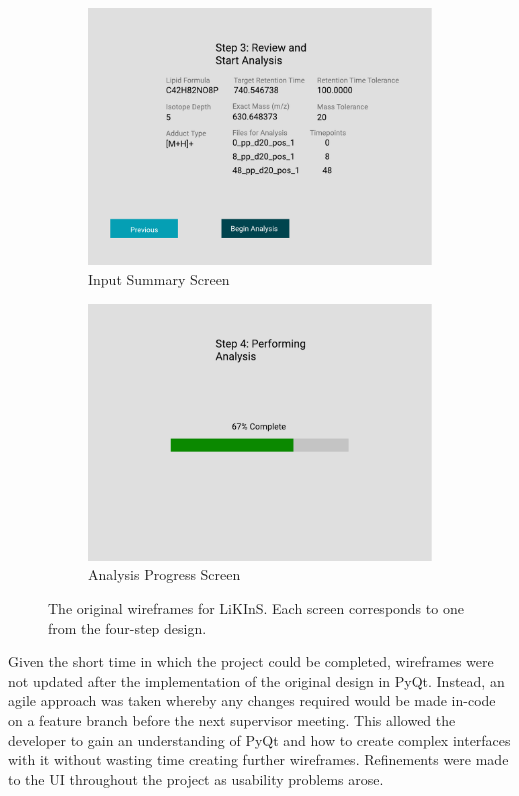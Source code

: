 \documentclass{l4proj}
\begin{document}
\begin{figure}
\begin{subfigure}{0.4\linewidth}
        \includegraphics[width=\linewidth]{dissertation/images/wireframes/wireframe3.pdf}
    \caption{Input Summary Screen}
        \end{subfigure}
        \begin{subfigure}{0.4\linewidth}
        \includegraphics[width=\linewidth]{dissertation/images/wireframes/wireframe4.pdf}
    \caption{Analysis Progress Screen}
    \end{subfigure}
    \caption{The original wireframes for LiKInS. Each screen corresponds to one from the four-step design.}
    \label{fig:wireframes}
\end{figure}


Given the short time in which the project could be completed, wireframes were not updated after the implementation of the original design in PyQt. Instead, an agile approach was taken whereby any changes required would be made in-code on a feature branch before the next supervisor meeting. This allowed the developer to gain an understanding of PyQt and how to create complex interfaces with it without wasting time creating further wireframes. Refinements were made to the UI throughout the project as usability problems arose.
\end{document}
